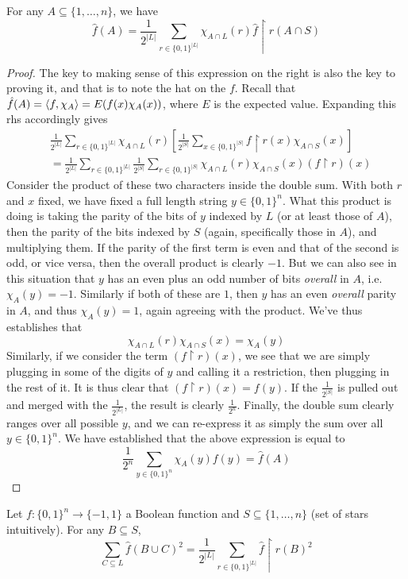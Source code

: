 \begin{lemma}
	For any $A \subseteq \{1,\ldots,n\}$, we have
	\[ \hat{f}(A) = \frac{1}{2^{|L|}} \sum_{r \in \{0,1\}^{|L|}}\chi_{A \cap L}(r)\hat{f} \restriction r(A \cap S) \]
\end{lemma}
\begin{proof}
	The key to making sense of this expression on the right is also the key to proving it, and that is to note the hat on the $f$. Recall that $\hat{f}(A) = \braket{f,\chi_A} = E(f(x)\chi_A(x))$, where $E$ is the expected value. Expanding this rhs accordingly gives
	\begin{align}
		& \frac{1}{2^{|L|}} \sum_{r \in \{0,1\}^{|L|}}\chi_{A \cap L}(r)\left[ \frac{1}{2^{|S|}} \sum_{x \in \{0,1\}^{|S|}} f \restriction r(x)\chi_{A \cap S}(x) \right] \\
		&= \frac{1}{2^{|L|}} \sum_{r \in \{0,1\}^{|L|}} \frac{1}{2^{|S|}} \sum_{r \in \{0,1\}^{|S|}} \chi_{A \cap L}(r)\chi_{A \cap S}(x)(f \restriction r)(x)
	\end{align}
	Consider the product of these two characters inside the double sum. With both $r$ and $x$ fixed, we have fixed a full length string $y \in \{0,1\}^n$. What this product is doing is taking the parity of the bits of $y$ indexed by $L$ (or at least those of $A$), then the parity of the bits indexed by $S$ (again, specifically those in $A$), and multiplying them. If the parity of the first term is even and that of the second is odd, or vice versa, then the overall product is clearly $-1$. But we can also see in this situation that $y$ has an even plus an odd number of bits \emph{overall} in $A$, i.e. $\chi_A(y) = -1$. Similarly if both of these are $1$, then $y$ has an even \emph{overall} parity in $A$, and thus $\chi_A(y) = 1$, again agreeing with the product. We've thus establishes that 
	\[ \chi_{A \cap L}(r)\chi_{A \cap S}(x) = \chi_A(y) \]
Similarly, if we consider the term $(f \restriction r)(x)$, we see that we are simply plugging in some of the digits of $y$ and calling it a restriction, then plugging in the rest of it. It is thus clear that $(f \restriction r)(x) = f(y)$. If the $\frac{1}{2^{|S|}}$ is pulled out and merged with the $\frac{1}{2^{|L|}}$, the result is clearly $\frac{1}{2^n}$. Finally, the double sum clearly ranges over all possible $y$, and we can re-express it as simply the sum over all $y \in \{0,1\}^n$. We have established that the above expression is equal to
\[ \frac{1}{2^n} \sum_{y \in \{0,1\}^{n}}  \chi_A(y)f(y) = \hat{f}(A) \]
\end{proof}
\begin{lemma}
	Let $f:\{0,1\}^n \to \{-1,1\}$ a Boolean function and $S \subseteq \{1,\ldots,n\}$ (set of stars intuitively). For any $B \subseteq S$, 
	\[ \sum_{C \subseteq L} \hat{f}(B \cup C)^2 = \frac{1}{2^{|L|}} \sum_{r \in \{0,1\}^{|L|}} \hat{f} \restriction r(B)^2  \]
\end{lemma}
